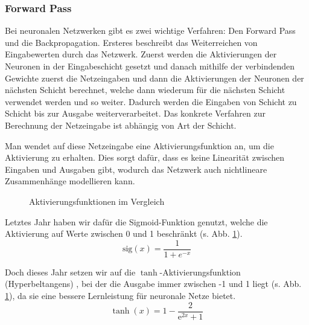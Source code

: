 \documentclass[10pt]{article}
\newcommand{\sig}{\textrm{sig}}
\begin{document}
\subsubsection{Forward Pass}
Bei neuronalen Netzwerken gibt es zwei wichtige Verfahren: Den Forward Pass und die Backpropagation.
Ersteres beschreibt das Weiterreichen %
von Eingabewerten durch das Netzwerk.
Zuerst werden die Aktivierungen der Neuronen in der Eingabeschicht gesetzt und danach mithilfe der verbindenden Gewichte zuerst die Netzeingaben und dann die Aktivierungen der Neuronen der nächsten Schicht berechnet, welche dann wiederum für die nächsten Schicht verwendet werden und so weiter.
Dadurch werden die Eingaben von Schicht zu Schicht bis zur Ausgabe weiterverarbeitet.
Das konkrete Verfahren zur Berechnung der Netzeingabe ist abhängig von Art der Schicht.

Man wendet auf diese Netzeingabe eine Aktivierungsfunktion an, um die Aktivierung zu erhalten.
Dies sorgt dafür, dass es keine Linearität zwischen Eingaben und Ausgaben gibt, wodurch das Netzwerk auch nichtlineare Zusammenhänge modellieren kann. %

\begin{figure}[h!]
    \centering
    \caption{Aktivierungsfunktionen im Vergleich}
    \label{fig:act_funcs}
\end{figure}

Letztes Jahr haben wir dafür die Sigmoid-Funktion genutzt, welche die Aktivierung auf Werte zwischen 0 und 1 beschränkt (s. Abb. \ref{fig:act_funcs}).
%
\[
    \sig(x) = \frac{1}{1+e^{-x}}
\]

Doch dieses Jahr setzen wir auf die $\tanh$-Aktivierungsfunktion (Hyperbeltangens) \cite{wiki:Hyperbeltangens}, bei der die Ausgabe immer zwischen -1 und 1 liegt (s. Abb. \ref{fig:act_funcs}), da sie 
eine bessere Lernleistung für neuronale Netze bietet. \cite{blog:activationFunctions, blog:tanhVsSigmoid} 
%
\[
    \tanh(x) = 1-\frac{2}{\mathrm{e}^{2x}+1}
\]
\end{document}

